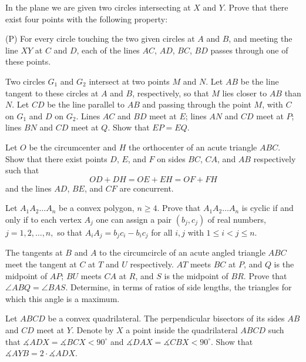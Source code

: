 \item[\textbf{G1.}]In the plane we are given two circles intersecting at $ X$ and $ Y$. Prove that there exist four points with the following property:

(P) For every circle touching the two given circles at $ A$ and $ B$,  and meeting the line $ XY$ at $ C$ and $ D$,  each of the lines $ AC$,  $ AD$,  $ BC$,  $ BD$ passes through one of these points.

\item[\textbf{G2.}]Two circles $ G_1$ and $ G_2$ intersect at two points $ M$ and $ N$. Let $ AB$ be the line tangent to these circles at $ A$ and $ B$,  respectively, so that $ M$ lies closer to $ AB$ than $ N$. Let $ CD$ be the line parallel to $ AB$ and passing through the point $ M$,  with $ C$ on $ G_1$ and $ D$ on $ G_2$. Lines $ AC$ and $ BD$ meet at $ E$; lines $ AN$ and $ CD$ meet at $ P$; lines $ BN$ and $ CD$ meet at $ Q$. Show that $ EP = EQ$.

\item[\textbf{G3.}]Let $O$ be the circumcenter and $H$ the orthocenter of an acute triangle $ABC$.  Show that there exist points $D$,  $E$,  and $F$ on sides $BC$,  $CA$,  and $AB$ respectively such that \[ OD + DH = OE + EH = OF + FH\] and the lines $AD$,  $BE$,  and $CF$ are concurrent.

\item[\textbf{G4.}]Let $ A_1A_2 \ldots A_n$ be a convex polygon, $ n \geq 4.$ Prove that $ A_1A_2 \ldots A_n$ is cyclic if and only if to each vertex $ A_j$ one can assign a pair $ (b_j, c_j)$ of real numbers, $ j = 1, 2, \ldots, n,$ so that $ A_iA_j = b_jc_i - b_ic_j$ for all $ i, j$ with $ 1 \leq i < j \leq n.$

\item[\textbf{G5.}]The tangents at $B$ and $A$ to the circumcircle of an acute angled triangle $ABC$ meet the tangent at $C$ at $T$ and $U$ respectively.  $AT$ meets $BC$ at $P$,  and $Q$ is the midpoint of $AP$; $BU$ meets $CA$ at $R$,  and $S$ is the midpoint of $BR$.  Prove that $\angle ABQ=\angle BAS$.  Determine, in terms of ratios of side lengths, the triangles for which this angle is a maximum.

\item[\textbf{G6.}]Let $ ABCD$ be a convex quadrilateral. The perpendicular bisectors of its sides $ AB$ and $ CD$ meet at $ Y$. Denote by $ X$ a point inside the quadrilateral $ ABCD$ such that $ \measuredangle ADX = \measuredangle BCX < 90^{\circ}$ and $ \measuredangle DAX = \measuredangle CBX < 90^{\circ}$. Show that $ \measuredangle AYB = 2\cdot\measuredangle ADX$.

